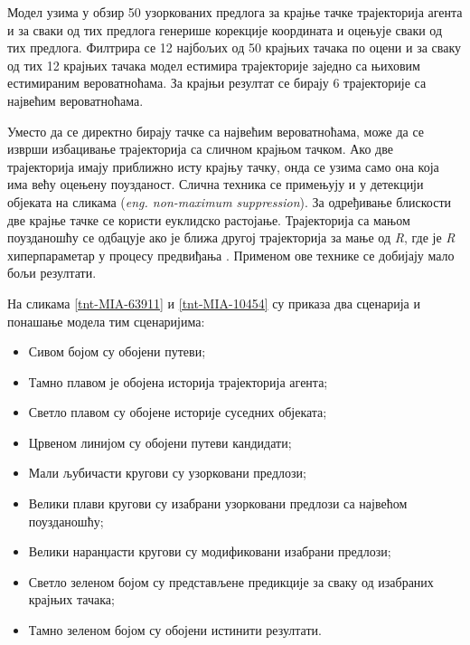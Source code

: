 \documentclass[11pt,oneside]{memoir}
\begin{document}
Модел узима у обзир 50 узоркованих предлога за крајње тачке трајекторија агента и за сваки од тих предлога генерише корекције координата
и оцењује сваки од тих предлога. Филтрира се 12 најбољих од 50 крајњих тачака по оцени и за сваку од тих 12 крајњих тачака
модел естимира трајекторије заједно са њиховим естимираним вероватноћама. За крајњи резултат се бирају 6 трајекторије са највећим 
вероватноћама. 

Уместо да се директно бирају тачке са највећим вероватноћама, може да се изврши избацивање трајекторија са сличном
крајњом тачком. Ако две трајекторија имају приближно исту крајњу тачку, онда се узима само она која има већу оцењену поузданост. Слична
техника се примењују и у детекцији објеката на сликама (\textit{eng. non-maximum suppression}). За одређивање блискости две крајње тачке
се користи еуклидско растојање. Трајекторија са мањом поузданошћу се одбацује ако је ближа другој трајекторија за мање од \textit{R},
где је \textit{R} хиперпараметар у процесу предвиђања \cite{vectornet}. Применом ове технике се добијају мало бољи резултати.

На сликама \ref{tnt-MIA-63911} и \ref{tnt-MIA-10454} су приказа два сценарија и понашање модела тим сценаријима:
\begin{itemize}
  \item Сивом бојом су обојени путеви; 
  \item Тамно плавом је обојена историја трајекторија агента;
  \item Светло плавом су обојене историје суседних објеката;
  \item Црвеном линијом су обојени путеви кандидати;
  \item Мали љубичасти кругови су узорковани предлози;
  \item Велики плави кругови су изабрани узорковани предлози са највећом поузданошћу;
  \item Велики наранџасти кругови су модификовани изабрани предлози; 
  \item Светло зеленом бојом су представљене предикције за сваку од изабраних крајњих тачака;
  \item Тамно зеленом бојом су обојени истинити резултати. 
\end{itemize}
\end{document}
